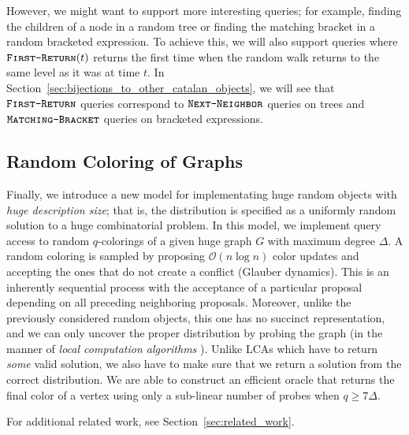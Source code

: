However, we might want to support more interesting queries; for example,
finding the children of a node in a random tree or finding the matching bracket in a random bracketed expression.
To achieve this, we will also support  queries
where $\texttt{\textsc{First-Return}}(t)$ returns the first time when the random walk returns to the same level as it was at time $t$.
In Section~\ref{sec:bijections_to_other_catalan_objects}, we will see that $\texttt{\textsc{First-Return}}$ queries correspond to
$\texttt{\textsc{Next-Neighbor}}$ queries on trees and $\texttt{\textsc{Matching-Bracket}}$ queries on bracketed expressions.





\subsection{Random Coloring of Graphs}%
\label{sec:random_coloring_of_graphs}
Finally, we introduce a new model for implementating huge random objects with \emph{huge description size};
that is, the distribution is specified as a uniformly random solution to a huge combinatorial problem.
In this model, we implement query access to random $q$-colorings of a given huge graph $G$ with maximum degree $\Delta$.
A random coloring is sampled by proposing $\mathcal O(n\log n)$ color updates and accepting the ones that do not create a conflict (Glauber dynamics).
This is an inherently sequential process with the acceptance of a particular proposal depending on all preceding neighboring proposals.
Moreover, unlike the previously considered random objects, this one has no succinct representation,
and we can only uncover the proper distribution by probing the graph (in the manner of \emph{local computation algorithms} \cite{LCA}).
Unlike LCAs which have to return \emph{some} valid solution, we also have to make sure that we return a solution from the correct distribution.
We are able to construct an efficient oracle that returns the final color of a vertex using only a sub-linear number of probes when $q\ge 7\Delta$.

For additional related work, see Section~\ref{sec:related_work}.
